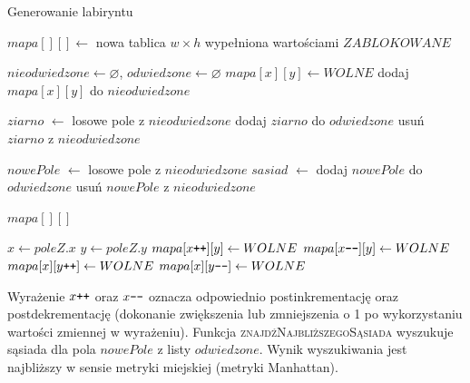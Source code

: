 \begin{algorithm}
	\caption{Generowanie labiryntu}\label{alg:mazegen}
  \begin{algorithmic}[1]
 
	\State $mapa[][] \gets$ nowa tablica $w \times h$ wypełniona wartościami $ZABLOKOWANE$

	\State $nieodwiedzone \gets \varnothing$, $odwiedzone \gets \varnothing$ 
	 
		 
			\State $mapa[x][y] \gets WOLNE$
			\State dodaj $mapa[x][y]$ do $nieodwiedzone$
		\EndFor
	\EndFor

	\State $ziarno$ $\gets$ losowe pole z $nieodwiedzone$
	\State dodaj $ziarno$ do $odwiedzone$ 
	\State usuń $ziarno$ z $nieodwiedzone$

	 
		\State $nowePole$ $\gets$ losowe pole z $nieodwiedzone$
		\State $sasiad$ $\gets$ 
		\State {}
		\State dodaj $nowePole$ do $odwiedzone$ 
		\State usuń $nowePole$ z $nieodwiedzone$
	\EndWhile

	 $mapa[][]$
\EndFunction

\State 
{}
	\State $x \gets poleZ.x$
	\State $y \gets poleZ.y$
	 
		\State $mapa[x\verb-++-][y] \gets WOLNE$ 
	\EndWhile
	 
		\State $mapa[x\verb+--+][y] \gets WOLNE$ 
	\EndWhile
	 
		\State $mapa[x][y\verb-++-] \gets WOLNE$ 
	\EndWhile
	 
		\State $mapa[x][y\verb+--+] \gets WOLNE$ 
	\EndWhile
\EndFunction
  \end{algorithmic}
\end{algorithm}

Wyrażenie $x\verb-++-$ oraz $x\verb+--+$ oznacza odpowiednio postinkrementację oraz postdekrementację (dokonanie zwiększenia lub zmniejszenia o 1 po wykorzystaniu wartości zmiennej w wyrażeniu).
Funkcja \textsc{znajdźNajbliższegoSąsiada} wyszukuje sąsiada dla pola $nowePole$ z listy $odwiedzone$. Wynik wyszukiwania jest najbliższy w sensie metryki miejskiej (metryki Manhattan).

